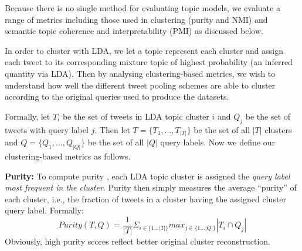 \documentclass{sig-alternate}
\begin{document}

Because there is no single method for evaluating topic models, we
evaluate a range of metrics including those used in clustering (purity
and NMI) and semantic topic coherence and interpretability (PMI)
as discussed below.

In order to cluster with LDA, we let a topic represent each cluster
and assign each tweet to its corresponding mixture topic of highest
probability (an inferred quantity via LDA).  Then by analysing
clustering-based metrics, we wish to understand how well the different
tweet pooling schemes are able to cluster according to the original
queries used to produce the datasets.  

Formally, let $T_{i}$ be the set of tweets in LDA topic cluster $i$ and
$Q_{j}$ be the set of tweets with query label $j$.  Then let $T = \lbrace
T_{1}, \ldots , T_{|T|} \rbrace$ be the set of all $|T|$ clusters and $Q =
\lbrace Q_{1}, \ldots , Q_{|Q|} \rbrace$ be the set of all $|Q|$
query labels.  Now we define our clustering-based metrics as follows.

\vspace{1mm} \noindent \textbf{Purity:} To compute purity \cite{MRS08}, each LDA
topic cluster is assigned the \emph{query label most frequent in the
cluster}.  Purity then simply measures the average ``purity'' of each
cluster, i.e., the fraction of tweets in a cluster having the assigned
cluster query label.  Formally:
\[
 \mathit{Purity}(T,Q) = \frac{1}{|T|} \Sigma_{i \in \{ 1\ldots|T|\} } max_{j \in \{1\ldots|Q| \} } |T_{i} \cap Q_{j}|
\]
Obviously, high purity scores reflect better original cluster
reconstruction.
\end{document}
